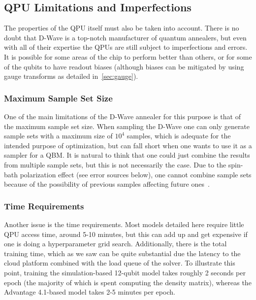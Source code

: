 \subsection{QPU Limitations and Imperfections}
The properties of the QPU itself must also be taken into account.
There is no doubt that D-Wave is a top-notch manufacturer of quantum annealers, but even with all of their expertise the QPUs are still subject to imperfections and errors.
It is possible for some areas of the chip to perform better than others, or for some of the qubits to have readout biases (although biases can be mitigated by using gauge transforms as detailed in~\cref{sec:gauge}).

\subsubsection{Maximum Sample Set Size}
One of the main limitations of the D-Wave annealer for this purpose is that of the maximum sample set size.
When sampling the D-Wave one can only generate sample sets with a maximum size of \( 10^4 \) samples, which is adequate for the intended purpose of optimization, but can fall short when one wants to use it as a sampler for a QBM.
It is natural to think that one could just combine the results from multiple sample sets, but this is not necessarily the case.
Due to the spin-bath polarization effect (see error sources below), one cannot combine sample sets because of the possibility of previous samples affecting future ones~\cite{pochart_2021}.

\subsubsection{Time Requirements}
Another issue is the time requirements.
Most models detailed here require little QPU access time, around 5-10 minutes, but this can add up and get expensive if one is doing a hyperparameter grid search.
Additionally, there is the total training time, which as we saw can be quite substantial due the latency to the cloud platform combined with the load queue of the solver.
To illustrate this point, training the simulation-based 12-qubit model takes roughly 2 seconds per epoch (the majority of which is spent computing the density matrix), whereas the Advantage 4.1-based model takes 2-5 minutes per epoch.

